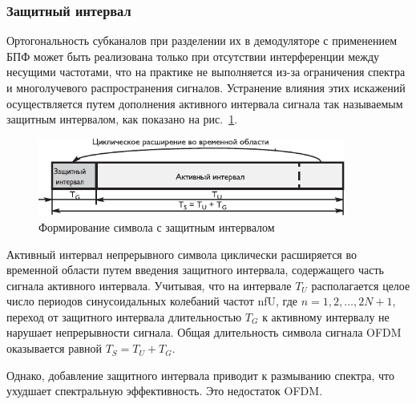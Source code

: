  
\subsubsection{Защитный интервал}

Ортогональность субканалов при разделении их в демодуляторе с применением БПФ может быть реализована только при отсутствии интерференции между несущими частотами, что на практике не выполняется из-за ограничения спектра и многолучевого распространения сигналов. Устранение влияния этих искажений осуществляется путем дополнения активного интервала сигнала так называемым защитным интервалом, как показано на рис.~\ref{guard}.

\begin{figure}[h]
\centering
\includegraphics[width = 0.9\textwidth]{guard_a.pdf}
\caption{Формирование символа с защитным интервалом}
\label{guard}
\end{figure}

Активный интервал непрерывного символа циклически расширяется во временной области путем введения защитного интервала, содержащего часть сигнала активного интервала.
Учитывая, что на интервале $T_U$ располагается целое число периодов синусоидальных колебаний частот nfU, где $n = 1, 2, \ldots, 2N + 1$, переход от защитного интервала длительностью $T_G$ к активному интервалу не нарушает непрерывности сигнала.
Общая длительность символа сигнала OFDM оказывается равной $T_S = T_U + T_G$.

Однако, добавление защитного интервала приводит к размыванию спектра, что ухудшает спектральную эффективность.
Это недостаток OFDM.


